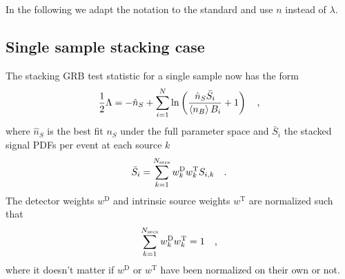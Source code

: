 In the following we adapt the notation to the standard and use $n$ instead of $\lambda$.


\subsection{Single sample stacking case}

The stacking GRB test statistic for a single sample now has the form
\begin{align}
  \frac{1}{2}\Lambda
  = -\hat{n}_S + \sum_{i=1}^N \ln\left(\frac{\hat{n}_S\bar{S}_i}{\Braket{n_B} B_i} + 1\right) \quad\text{,}
\label{equ:TS}
\end{align}
where $\hat{n}_S$ is the best fit $n_S$ under the full parameter space and $\bar{S}_i$ the stacked signal PDFs per event at each source $k$
\begin{equation}
  \bar{S}_i = \sum_{k=1}^{N_\text{srcs}} w_k^\text{D} w_k^\text{T} S_{i,k} \quad\text{.}
\end{equation}
The detector weights $w^\text{D}$ and intrinsic source weights $w^\text{T}$ are normalized such that
\begin{equation}
  \sum_{k=1}^{N_\text{srcs}} w^\text{D}_k w^\text{T}_k = 1 \quad\text{,}
\end{equation}
where it doesn't matter if $w^\text{D}$ or $w^\text{T}$ have been normalized on their own or not.

